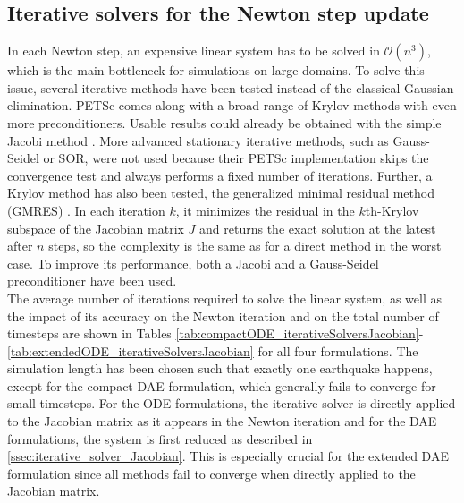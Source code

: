 \subsection{Iterative solvers for the Newton step update}
In each Newton step, an expensive linear system has to be solved in $\mathcal{O}\left(n^3\right)$, which is the main bottleneck for simulations on large domains. To solve this issue, several iterative methods have been tested instead of the classical Gaussian elimination. PETSc comes along with a broad range of Krylov methods with even more preconditioners. Usable results could already be obtained with the simple Jacobi method \cite[p. 230]{IterativeSolutionMethods}. More advanced stationary iterative methods, such as Gauss-Seidel or SOR, were not used because their PETSc implementation skips the convergence test and always performs a fixed number of iterations. Further, a Krylov method has also been tested, the generalized minimal residual method (GMRES) \cite{GMRES}. In each iteration $k$, it minimizes the residual in the $k$th-Krylov subspace of the Jacobian matrix $J$ and returns the exact solution at the latest after $n$ steps, so the complexity is the same as for a direct method in the worst case. To improve its performance, both a Jacobi and a Gauss-Seidel preconditioner have been used. \\
The average number of iterations required to solve the linear system, as well as the impact of its accuracy on the Newton iteration and on the total number of timesteps are shown in Tables \ref{tab:compactODE_iterativeSolversJacobian}-\ref{tab:extendedODE_iterativeSolversJacobian} for all four formulations. The simulation length has been chosen such that exactly one earthquake happens, except for the compact DAE formulation, which generally fails to converge for small timesteps. For the ODE formulations, the iterative solver is directly applied to the Jacobian matrix as it appears in the Newton iteration and for the DAE formulations, the system is first reduced as described in \autoref{ssec:iterative_solver_Jacobian}. This is especially crucial for the extended DAE formulation since all methods fail to converge when directly applied to the Jacobian matrix. 

